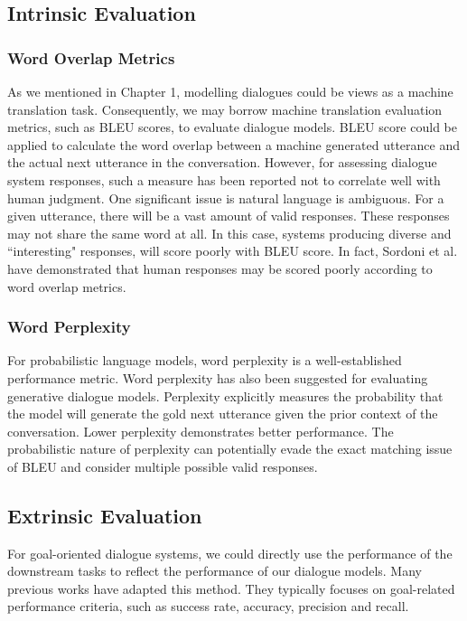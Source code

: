 \documentclass[bsc,frontabs,twoside,singlespacing,parskip,deptreport]{infthesis}     %
\begin{document}
\subsection{Intrinsic Evaluation}

\subsubsection*{Word Overlap Metrics}

As we mentioned in Chapter 1, modelling dialogues could be views as a machine translation task. Consequently, we may borrow machine translation evaluation metrics, such as BLEU scores\cite{papineni2002bleu}, to evaluate dialogue models. BLEU score could be applied to calculate the word overlap between a machine generated utterance and the actual next utterance in the conversation. However, for assessing dialogue system responses, such a measure has been reported not to correlate well with human judgment\cite{liu2016not}. One significant issue is natural language is ambiguous. For a given utterance, there will be a vast amount of valid responses. These responses may not share the same word at all. In this case, systems producing diverse and ``interesting" responses, will score poorly with BLEU score. In fact, Sordoni et al.\cite{sordoni2015neural} have demonstrated that human responses may be scored poorly according to word overlap metrics.

\subsubsection*{Word Perplexity}

For probabilistic language models, word perplexity is a well-established performance metric\cite{bengio2003neural,mikolov2010recurrent}. Word perplexity has also been suggested for evaluating generative dialogue models\cite{pietquin2013survey}. Perplexity explicitly measures the probability that the model will generate the gold next utterance given the prior context of the conversation. Lower perplexity demonstrates better performance. The probabilistic nature of perplexity can potentially evade the exact matching issue of BLEU and consider multiple possible valid responses.

\subsection{Extrinsic Evaluation}

For goal-oriented dialogue systems, we could directly use the performance of the downstream tasks to reflect the performance of our dialogue models. Many previous works\cite{strub2017end,shekhar2017foil,reddy2019coqa,zhou2018dataset,de2017guesswhat,das2017visual,das2017learning} have adapted this method. They typically focuses on goal-related performance criteria, such as success rate, accuracy, precision and recall.
\end{document}

